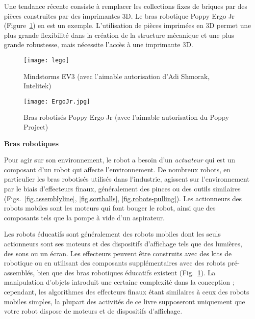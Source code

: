 Une tendance récente consiste à remplacer les collections fixes de briques par des pièces construites par des imprimantes 3D. Le bras robotique Poppy Ergo Jr (Figure~\ref{fig.poppy}) en est un exemple. L'utilisation de pièces imprimées en 3D permet une plus grande flexibilité dans la création de la structure mécanique et une plus grande robustesse, mais nécessite l'accès à une imprimante 3D. 

\begin{figure}
\begin{minipage}{.45\textwidth}
\begin{center}
\texttt{[image: lego]}
\end{center}
\caption{\lego{} Mindstorms EV3 (avec l'aimable autorisation d'Adi Shmorak, Intelitek)}
\label{fig.lego}
\end{minipage}
\hspace{\fill}
\begin{minipage}{.45\textwidth}
\begin{center}
\texttt{[image: ErgoJr.jpg]}
\end{center}
\caption{Bras robotisés Poppy Ergo Jr (avec l'aimable autorisation du Poppy Project)}
\label{fig.poppy}
\end{minipage}
\end{figure}


\noindent\textbf{Bras robotiques}

Pour agir sur son environnement, le robot a besoin d'un \emph{actuateur} qui est un composant d'un robot qui affecte l'environnement. De nombreux robots, en particulier les bras robotisés utilisés dans l'industrie, agissent sur l'environnement par le biais d'effecteurs finaux, généralement des pinces ou des outils similaires (Figs.~\ref{fig.assemblyline}, \ref{fig.sortballs}, \ref{fig.robots-pulling}). Les actionneurs des robots mobiles sont les moteurs qui font bouger le robot, ainsi que des composants tels que la pompe à vide d'un aspirateur.

Les robots éducatifs sont généralement des robots mobiles dont les seuls actionneurs sont ses moteurs et des dispositifs d'affichage tels que des lumières, des sons ou un écran. Les effecteurs peuvent être construits avec des kits de robotique ou en utilisant des composants supplémentaires avec des robots pré-assemblés, bien que des bras robotiques éducatifs existent (Fig.~\ref{fig.poppy}). La manipulation d'objets introduit une certaine complexité dans la conception ; cependant, les algorithmes des effecteurs finaux étant similaires à ceux des robots mobiles simples, la plupart des activités de ce livre supposeront uniquement que votre robot dispose de moteurs et de dispositifs d'affichage.

